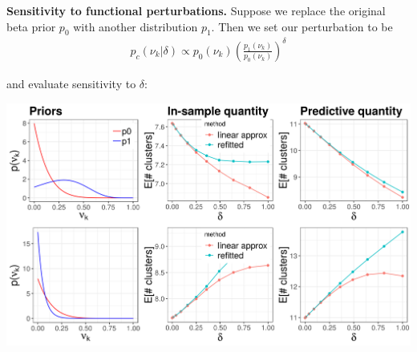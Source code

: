 \documentclass[a0,plainsections,30pt]{sciposter}\usepackage[]{graphicx}\usepackage[]{color}
\newenvironment{knitrout}{}{} %
\begin{document}
\begin{minipage}[t]{0.45\textwidth}
{\bf \large Sensitivity to functional perturbations. }
Suppose we replace the original beta prior $p_0$ with another distribution $p_1$. Then we set our perturbation to be
\vspace{-0.3in}
\begin{align*}
p_c(\nu_k \vert \delta) \propto p_{0}(\nu_k)\left(\frac{p_1(\nu_k)}{p_0(\nu_k)}\right)^\delta
\end{align*}
\vspace{-0.3in}

and evaluate sensitivity to $\delta$:
%
\vspace{0.1in}

\begin{knitrout}
\color{fgcolor}

{\centering \includegraphics[width=0.98\linewidth,height=0.588\linewidth]{figure/functional_sens_plot-1} 

}



\end{knitrout}


\end{minipage}
\end{document}

